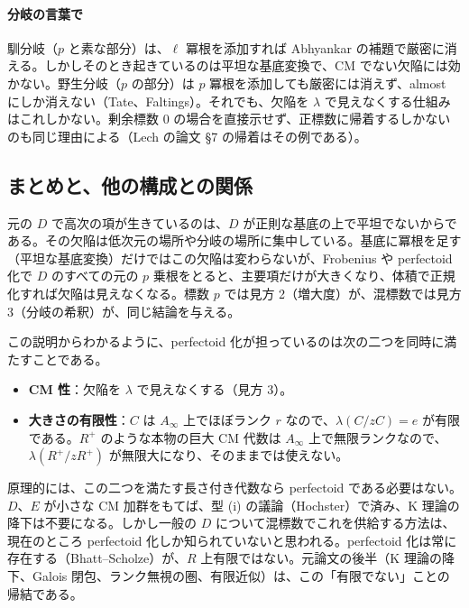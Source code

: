 \documentclass[11pt,a4paper]{ltjsarticle}
\numberwithin{equation}{section}
\theoremstyle{plain}
\theoremstyle{definition}
\theoremstyle{definition}
\begin{document}
\paragraph{分岐の言葉で}
馴分岐（$p$ と素な部分）は、$\ell$ 冪根を添加すれば Abhyankar の補題で厳密に消える。しかしそのとき起きているのは平坦な基底変換で、CM でない欠陥には効かない。野生分岐（$p$ の部分）は $p$ 冪根を添加しても厳密には消えず、almost にしか消えない（Tate、Faltings）。それでも、欠陥を $\lambda$ で見えなくする仕組みはこれしかない。剰余標数 $0$ の場合を直接示せず、正標数に帰着するしかないのも同じ理由による（Lech の論文 §7 の帰着はその例である）。

\subsection{まとめと、他の構成との関係}

元の $D$ で高次の項が生きているのは、$D$ が正則な基底の上で平坦でないからである。その欠陥は低次元の場所や分岐の場所に集中している。基底に冪根を足す（平坦な基底変換）だけではこの欠陥は変わらないが、Frobenius や perfectoid 化で $D$ のすべての元の $p$ 乗根をとると、主要項だけが大きくなり、体積で正規化すれば欠陥は見えなくなる。標数 $p$ では見方 2（増大度）が、混標数では見方 3（分岐の希釈）が、同じ結論を与える。

この説明からわかるように、perfectoid 化が担っているのは次の二つを同時に満たすことである。
\begin{itemize}
  \item \textbf{CM 性}：欠陥を $\lambda$ で見えなくする（見方 3）。
  \item \textbf{大きさの有限性}：$C$ は $A_\infty$ 上でほぼランク $r$ なので、$\lambda(C/zC) = e$ が有限である。$R^+$ のような本物の巨大 CM 代数は $A_\infty$ 上で無限ランクなので、$\lambda(R^+/zR^+)$ が無限大になり、そのままでは使えない。
\end{itemize}
原理的には、この二つを満たす長さ付き代数なら perfectoid である必要はない。$D$、$E$ が小さな CM 加群をもてば、型 (i) の議論（Hochster）で済み、K 理論の降下は不要になる。しかし一般の $D$ について混標数でこれを供給する方法は、現在のところ perfectoid 化しか知られていないと思われる。perfectoid 化は常に存在する（Bhatt--Scholze）が、$R$ 上有限ではない。元論文の後半（K 理論の降下、Galois 閉包、ランク無視の圏、有限近似）は、この「有限でない」ことの帰結である。
\end{document}
